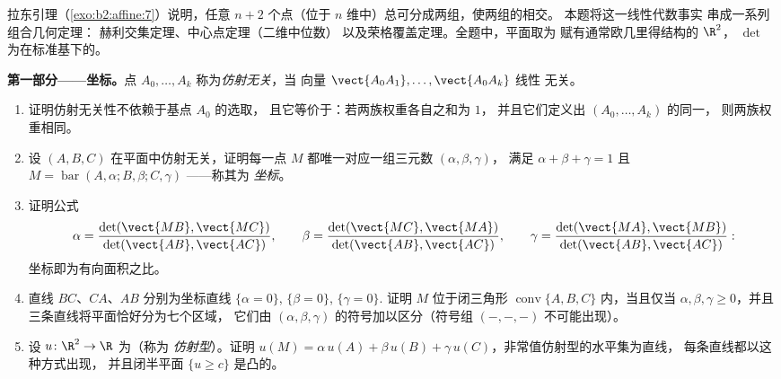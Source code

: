 \begin{problem}\label{pb:b2:affine:1}
拉东引理（\cref{exo:b2:affine:7}）说明，任意 $n + 2$
个点（位于 $n$ 维中）总可分成两组，使两组的相交。
本题将这一线性代数事实
串成一系列组合几何定理：
赫利交集定理、中心点定理（二维中位数）
以及荣格覆盖定理。全题中，平面取为
赋有通常欧几里得结构的 $\R^2$，
$\det$ 为在标准基下的。

\medskip
\noindent\textbf{第一部分——坐标。}点
$A_0, \dots, A_k$ 称为\emph{仿射无关}，当
向量 $\vect{A_0A_1}, \dots, \vect{A_0A_k}$ 线性
无关。
\begin{enumerate}
  \item 证明仿射无关性不依赖于基点 $A_0$ 的选取，
        且它等价于：若两族权重各自之和为 $1$，
        并且它们定义出 $(A_0,
        \dots, A_k)$ 的同一，
        则两族权重相同。
  \item 设 $(A, B, C)$ 在平面中仿射无关，证明每一点 $M$
        都唯一对应一组三元数 $(\alpha, \beta, \gamma)$，
        满足 $\alpha + \beta +
        \gamma = 1$ 且 $M = \operatorname{bar}(A, \alpha; B,
        \beta; C, \gamma)$ ——称其为\emph{
        坐标}。
  \item 证明公式
        \[
        \alpha = \frac{\det(\vect{MB},
        \vect{MC})}{\det(\vect{AB}, \vect{AC})},
        \qquad
        \beta = \frac{\det(\vect{MC},
        \vect{MA})}{\det(\vect{AB}, \vect{AC})},
        \qquad
        \gamma = \frac{\det(\vect{MA},
        \vect{MB})}{\det(\vect{AB}, \vect{AC})} :
        \]
        坐标即为有向面积之比。
  \item 直线 $BC$、$CA$、$AB$ 分别为坐标直线
        $\{\alpha = 0\}$, $\{\beta = 0\}$, $\{\gamma = 0\}$.
        证明 $M$ 位于闭三角形
        $\operatorname{conv}\{A, B, C\}$ 内，当且仅当 $\alpha, \beta,
        \gamma \geq 0$，并且三条直线将平面恰好分为七个区域，
        它们由
        $(\alpha, \beta, \gamma)$ 的符号加以区分（符号组 $(-, -,
        -)$ 不可能出现）。
  \item 设 $u \colon \R^2 \to \R$ 为（称为
        \emph{仿射型}）。证明 $u(M) = \alpha\,u(A) +
        \beta\,u(B) + \gamma\,u(C)$，非常值仿射型的水平集为直线，
        每条直线都以这种方式出现，
        并且闭半平面 $\{u
        \geq c\}$ 是凸的。
\end{enumerate}


\end{problem}
